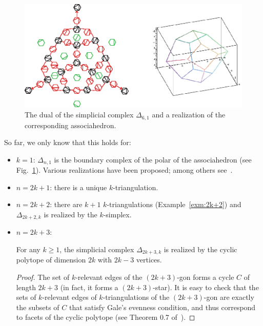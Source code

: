 \documentclass[12pt]{amsart}
\begin{document}
\begin{figure}[!h]
\centerline{\includegraphics[scale=.9]{associahedron.eps}}
\caption{\small{The dual of the simplicial complex $\Delta_{6,1}$ and a realization of the corresponding associahedron.}}\label{associahedron}
\end{figure}

So far, we only know that this holds for:
\begin{itemize}
\item $k=1$: $\Delta_{n,1}$ is the boundary complex of the polar of the associahedron (see Fig.~\ref{associahedron}). Various realizations have been proposed; among others see~\cite{bfs-ccsp-90, fr-ga-05, hl-rac-07, l-at-89, l-rsp-04}.

\item $n=2k+1$: there is a unique $k$-triangulation.

\item $n=2k+2$: there are $k+1$ $k$-triangulations (Example~\ref{exm:2k+2}) 
and $\Delta_{2k+2,k}$ is realized by the $k$-simplex. 

\item $n=2k+3$:

\begin{lemma}
\label{lemma:2k+3}
For any $k\ge 1$, the simplicial complex $\Delta_{2k+3,k}$ is realized by the cyclic polytope of dimension $2k$ with $2k-3$ vertices.
\end{lemma}

\begin{proof}
The set of $k$-relevant edges of the $(2k+3)$-gon forms a cycle $C$ of length $2k+3$ (in fact, it forms a $(2k+3)$-star). It is easy to check that the sets of $k$-relevant edges of $k$-triangulations of the $(2k+3)$-gon are exactly the subsets of $C$ that satisfy Gale's evenness condition, and thus correspond to facets of the cyclic polytope (see Theorem 0.7 of~\cite{z-lp-95}).
\end{proof}
\end{itemize}
\end{document}
